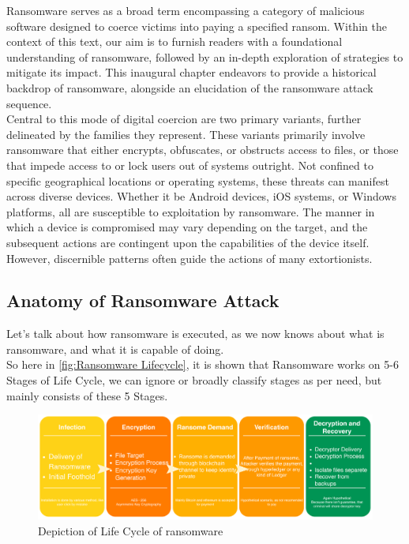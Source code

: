 \documentclass[12pt,letterpaper]{article}
\begin{document}
    Ransomware serves as a broad term encompassing a category of malicious software designed to coerce victims into paying a specified ransom. Within the context of this text, our aim is to furnish readers with a foundational understanding of ransomware, followed by an in-depth exploration of strategies to mitigate its impact. This inaugural chapter endeavors to provide a historical backdrop of ransomware, alongside an elucidation of the ransomware attack sequence.
    \\
    Central to this mode of digital coercion are two primary variants, further delineated by the families they represent. These variants primarily involve ransomware that either encrypts, obfuscates, or obstructs access to files, or those that impede access to or lock users out of systems outright. Not confined to specific geographical locations or operating systems, these threats can manifest across diverse devices. Whether it be Android devices, iOS systems, or Windows platforms, all are susceptible to exploitation by ransomware. The manner in which a device is compromised may vary depending on the target, and the subsequent actions are contingent upon the capabilities of the device itself. However, discernible patterns often guide the actions of many extortionists.

    \subsection{Anatomy of Ransomware Attack}

    Let's talk about how ransomware is executed, as we now knows about what is ransomware, and what it is capable of doing. \\ So here in \autoref{fig:Ransomware Lifecycle}, it is shown that Ransomware works on 5-6 Stages of Life Cycle, we can ignore or broadly classify stages as per need, but mainly consists of these 5 Stages.\cite{liska2016ransomware}

        \begin{figure}[h]
            \centering
            \includegraphics[width=\textwidth]{images/lifecycle.pdf}
            \caption{Depiction of Life Cycle of ransomware}
            \label{fig:Ransomware Lifecycle}
        \end{figure}
        
\end{document}
